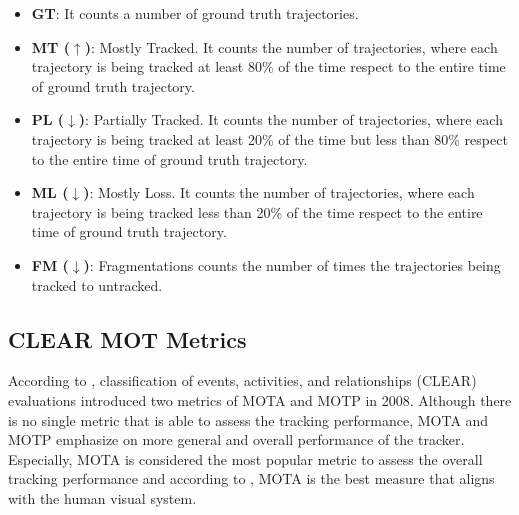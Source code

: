 \begin{itemize}

\item \textbf{GT}: It counts a number of ground truth trajectories.

\item \textbf{MT ($\uparrow$)}: Mostly Tracked. It counts the number of trajectories, where each trajectory is being tracked at least 80\% of the time respect to the entire time of ground truth trajectory.

\item \textbf{PL ($\downarrow$)}: Partially Tracked. It counts the number of trajectories, where each trajectory is being tracked at least 20\% of the time but less than 80\% respect to the entire time of ground truth trajectory.

\item \textbf{ML ($\downarrow$)}: Mostly Loss. It counts the number of trajectories, where each trajectory is being tracked less than 20\% of the time respect to the entire time of ground truth trajectory.

\item \textbf{FM ($\downarrow$)}: Fragmentations counts the number of times the trajectories being tracked to untracked.
\end{itemize}



\subsection{CLEAR MOT Metrics}
According to \cite{bernardin_evaluating_2008}, classification of
events, activities, and relationships (CLEAR) evaluations introduced two metrics of MOTA and MOTP in 2008.
Although there is no single metric that is able to assess the tracking performance, MOTA and MOTP emphasize on more general and overall performance of the tracker. Especially, MOTA is considered the most popular metric to assess the overall tracking performance \cite{milan_mot16_2016} and according to \cite{leal-taixe_tracking_2017}, MOTA is the best measure that aligns with the human visual system.

